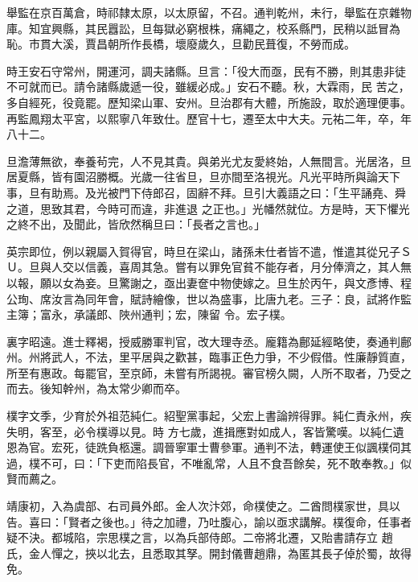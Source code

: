 \begin{pinyinscope}
 舉監在京百萬倉，時祁隸太原，以太原留，不召。通判乾州，未行，舉監在京雜物庫。知宜興縣，其民囂訟，旦每獄必窮根株，痛繩之，校系縣門，民稍以詆冒為恥。市貫大溪，賈昌朝所作長橋，壞廢歲久，旦勸民葺復，不勞而成。



 時王安石守常州，開運河，調夫諸縣。旦言：「役大而亟，民有不勝，則其患非徒不可就而已。請令諸縣歲遞一役，雖緩必成。」安石不聽。秋，大霖雨，民
 苦之，多自經死，役竟罷。歷知梁山軍、安州。旦治郡有大體，所施設，取於適理便事。再監鳳翔太平宮，以熙寧八年致仕。歷官十七，遷至太中大夫。元祐二年，卒，年八十二。



 旦澹薄無欲，奉養茍完，人不見其貴。與弟光尤友愛終始，人無間言。光居洛，旦居夏縣，皆有園沼勝概。光歲一往省旦，旦亦間至洛視光。凡光平時所與論天下事，旦有助焉。及光被門下侍郎召，固辭不拜。旦引大義語之曰：「生平誦堯、舜之道，思致其君，今時可而違，非進退
 之正也。」光幡然就位。方是時，天下懼光之終不出，及聞此，皆欣然稱旦曰：「長者之言也。」



 英宗即位，例以親屬入賀得官，時旦在梁山，諸孫未仕者皆不遣，惟遣其從兄子ＳＵ。旦與人交以信義，喜周其急。嘗有以罪免官貧不能存者，月分俸濟之，其人無以報，願以女為妾。旦驚謝之，亟出妻奩中物使嫁之。旦生於丙午，與文彥博、程公珣、席汝言為同年會，賦詩繪像，世以為盛事，比唐九老。三子：良，試將作監主簿；富永，承議郎、陜州通判；宏，陳留
 令。宏子樸。



 裏字昭遠。進士釋褐，授威勝軍判官，改大理寺丞。龐籍為鄜延經略使，奏通判鄜州。州將武人，不法，里平居與之歡甚，臨事正色力爭，不少假借。性廉靜質直，所至有惠政。每罷官，至京師，未嘗有所謁視。審官榜久闕，人所不取者，乃受之而去。後知幹州，為太常少卿而卒。



 樸字文季，少育於外祖范純仁。紹聖黨事起，父宏上書論辨得罪。純仁責永州，疾失明，客至，必令樸導以見。時
 方七歲，進揖應對如成人，客皆驚嘆。以純仁遺恩為官。宏死，徒跣負柩還。調晉寧軍士曹參軍。通判不法，轉運使王似諷樸伺其過，樸不可，曰：「下吏而陷長官，不唯亂常，人且不食吾餘矣，死不敢奉教。」似賢而薦之。



 靖康初，入為虞部、右司員外郎。金人次汴郊，命樸使之。二酋問樸家世，具以告。喜曰：「賢者之後也。」待之加禮，乃吐腹心，諭以亟求講解。樸復命，任事者疑不決。都城陷，宗思樸之言，以為兵部侍郎。二帝將北遷，又貽書請存立
 趙氏，金人憚之，挾以北去，且悉取其孥。開封儀曹趙鼎，為匿其長子倬於蜀，故得免。




\end{pinyinscope}
